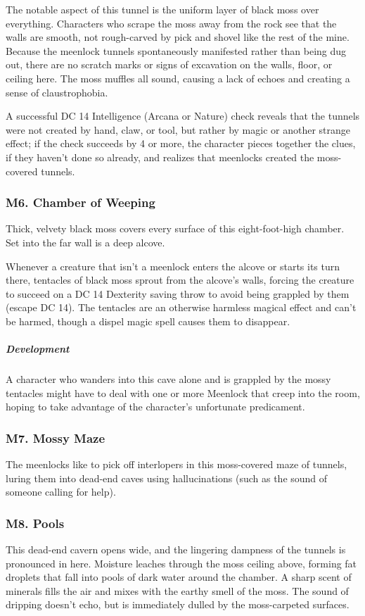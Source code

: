 \documentclass[10pt,a4paper,twoside,bg=print,twocolumn,openany,nodeprecatedcode]{dndbook}
\begin{document}
The notable aspect of this tunnel is the uniform layer of black moss over everything. Characters who scrape the moss away from the rock see that the walls are smooth, not rough-carved by pick and shovel like the rest of the mine. Because the meenlock tunnels spontaneously manifested rather than being dug out, there are no scratch marks or signs of excavation on the walls, floor, or ceiling here. The moss muffles all sound, causing a lack of echoes and creating a sense of claustrophobia.

A successful DC 14 Intelligence (Arcana or Nature) check reveals that the tunnels were not created by hand, claw, or tool, but rather by magic or another strange effect; if the check succeeds by 4 or more, the character pieces together the clues, if they haven't done so already, and realizes that meenlocks created the moss-covered tunnels.

\subsubsection{M6. Chamber of Weeping}
\begin{DndReadAloud}{}
Thick, velvety black moss covers every surface of this eight-foot-high chamber. Set into the far wall is a deep alcove.

\end{DndReadAloud}

Whenever a creature that isn't a meenlock enters the alcove or starts its turn there, tentacles of black moss sprout from the alcove's walls, forcing the creature to succeed on a DC 14 Dexterity saving throw to avoid being grappled by them (escape DC 14). The tentacles are an otherwise harmless magical effect and can't be harmed, though a dispel magic spell causes them to disappear.

\subparagraph{Development}
A character who wanders into this cave alone and is grappled by the mossy tentacles might have to deal with one or more Meenlock that creep into the room, hoping to take advantage of the character's unfortunate predicament.

\subsubsection{M7. Mossy Maze}
The meenlocks like to pick off interlopers in this moss-covered maze of tunnels, luring them into dead-end caves using hallucinations (such as the sound of someone calling for help).

\subsubsection{M8. Pools}
\begin{DndReadAloud}{}
This dead-end cavern opens wide, and the lingering dampness of the tunnels is pronounced in here. Moisture leaches through the moss ceiling above, forming fat droplets that fall into pools of dark water around the chamber. A sharp scent of minerals fills the air and mixes with the earthy smell of the moss. The sound of dripping doesn't echo, but is immediately dulled by the moss-carpeted surfaces.

\end{DndReadAloud}
\end{document}
